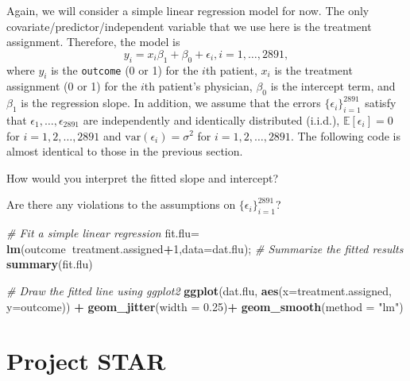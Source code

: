 \documentclass[12pt,]{book}
\newenvironment{Shaded}{\begin{snugshade}}{\end{snugshade}}
\newcommand{\KeywordTok}[1]{\textcolor[rgb]{0.13,0.29,0.53}{\textbf{#1}}}
\newcommand{\DataTypeTok}[1]{\textcolor[rgb]{0.13,0.29,0.53}{#1}}
\newcommand{\DecValTok}[1]{\textcolor[rgb]{0.00,0.00,0.81}{#1}}
\newcommand{\FloatTok}[1]{\textcolor[rgb]{0.00,0.00,0.81}{#1}}
\newcommand{\StringTok}[1]{\textcolor[rgb]{0.31,0.60,0.02}{#1}}
\newcommand{\CommentTok}[1]{\textcolor[rgb]{0.56,0.35,0.01}{\textit{#1}}}
\newcommand{\OperatorTok}[1]{\textcolor[rgb]{0.81,0.36,0.00}{\textbf{#1}}}
\newcommand{\NormalTok}[1]{#1}
\begin{document}
Again, we will consider a simple linear regression model for now. The
only covariate/predictor/independent variable that we use here is the
treatment assignment. Therefore, the model is \[
    y_i = x_i \beta_1  +\beta_0 +  \epsilon_i, i=1,\ldots, 2891,
    \] where \(y_i\) is the \texttt{outcome} (0 or 1) for the \(i\)th
patient, \(x_i\) is the treatment assignment (0 or 1) for the \(i\)th
patient's physician, \(\beta_0\) is the intercept term, and \(\beta_1\)
is the regression slope. In addition, we assume that the errors
\(\{\epsilon_i\}_{i=1}^{2891}\) satisfy that
\(\epsilon_1,\ldots, \epsilon_2891\) are independently and identically
distributed (i.i.d.), \(\mathbb{E}[\epsilon_i]= 0\) for
\(i=1,2,\ldots, 2891\) and \(\mathrm{var}(\epsilon_i)=\sigma^2\) for
\(i=1,2,\ldots, 2891\). The following code is almost identical to those
in the previous section.

How would you interpret the fitted slope and intercept?

Are there any violations to the assumptions on
\(\{\epsilon_i\}_{i=1}^2891\)?

\begin{Shaded}
\begin{Highlighting}[]
\CommentTok{# Fit a simple linear regression}
\NormalTok{fit.flu=}\StringTok{ }\KeywordTok{lm}\NormalTok{(outcome}\OperatorTok{~}\NormalTok{treatment.assigned}\OperatorTok{+}\DecValTok{1}\NormalTok{,}\DataTypeTok{data=}\NormalTok{dat.flu); }
\CommentTok{# Summarize the fitted results}
\KeywordTok{summary}\NormalTok{(fit.flu) }

\CommentTok{# Draw the fitted line using ggplot2 }
\KeywordTok{ggplot}\NormalTok{(dat.flu, }\KeywordTok{aes}\NormalTok{(}\DataTypeTok{x=}\NormalTok{treatment.assigned, }\DataTypeTok{y=}\NormalTok{outcome)) }\OperatorTok{+}\StringTok{ }
\StringTok{  }\KeywordTok{geom_jitter}\NormalTok{(}\DataTypeTok{width =} \FloatTok{0.25}\NormalTok{)}\OperatorTok{+}
\StringTok{  }\KeywordTok{geom_smooth}\NormalTok{(}\DataTypeTok{method =} \StringTok{"lm"}\NormalTok{)}
\end{Highlighting}
\end{Shaded}

\section{Project STAR}\label{project-star}
\end{document}
